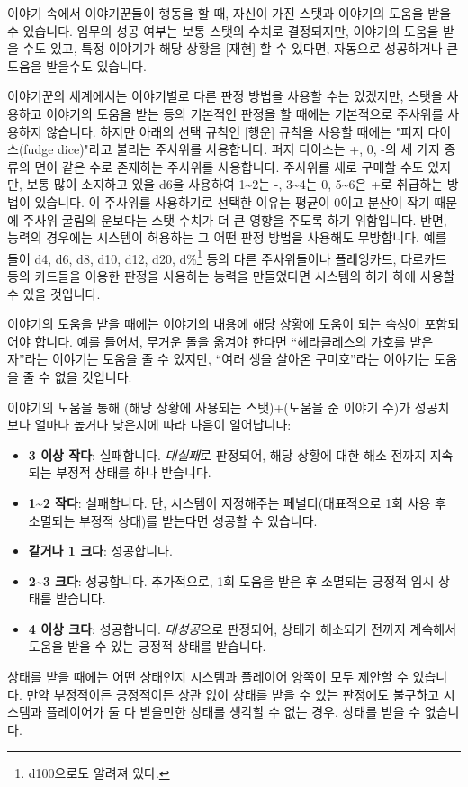 \documentclass[12pt]{report}
\begin{document}
	이야기 속에서 이야기꾼들이 행동을 할 때, 자신이 가진 스탯과 이야기의 도움을 받을 수 있습니다. 임무의 성공 여부는 보통 스탯의 수치로 결정되지만, 이야기의 도움을 받을 수도 있고, 특정 이야기가 해당 상황을 [재현] 할 수 있다면, 자동으로 성공하거나 큰 도움을 받을수도 있습니다.
	
	\bigskip
	
	이야기꾼의 세계에서는 이야기별로 다른 판정 방법을 사용할 수는 있겠지만, 스탯을 사용하고 이야기의 도움을 받는 등의 기본적인 판정을 할 때에는 기본적으로 주사위를 사용하지 않습니다. 하지만 아래의 선택 규칙인 [행운] 규칙을 사용할 때에는 "퍼지 다이스(fudge dice)"라고 불리는 주사위를 사용합니다. 퍼지 다이스는 +, 0, -의 세 가지 종류의 면이 같은 수로 존재하는 주사위를 사용합니다. 주사위를 새로 구매할 수도 있지만, 보통 많이 소지하고 있을 d6을 사용하여 1\textasciitilde2는 -, 3\textasciitilde4는 0, 5\textasciitilde6은 +로 취급하는 방법이 있습니다. 이 주사위를 사용하기로 선택한 이유는 평균이 0이고 분산이 작기 때문에 주사위 굴림의 운보다는 스탯 수치가 더 큰 영향을 주도록 하기 위함입니다. 반면, 능력의 경우에는 시스템이 허용하는 그 어떤 판정 방법을 사용해도 무방합니다. 예를 들어 d4, d6, d8, d10, d12, d20, d\%\footnote{d100으로도 알려져 있다.} 등의 다른 주사위들이나 플레잉카드, 타로카드 등의 카드들을 이용한 판정을 사용하는 능력을 만들었다면 시스템의 허가 하에 사용할 수 있을 것입니다.
	
	\bigskip
	
	이야기의 도움을 받을 때에는 이야기의 내용에 해당 상황에 도움이 되는 속성이 포함되어야 합니다. 예를 들어서, 무거운 돌을 옮겨야 한다면 “헤라클레스의 가호를 받은 자”라는 이야기는 도움을 줄 수 있지만, “여러 생을 살아온 구미호”라는 이야기는 도움을 줄 수 없을 것입니다.
	
	이야기의 도움을 통해 (해당 상황에 사용되는 스탯)+(도움을 준 이야기 수)가 성공치보다 얼마나 높거나 낮은지에 따라 다음이 일어납니다:
	\begin{itemize}
		\item \textbf{3 이상 작다}: 실패합니다. \emph{대실패}로 판정되어, 해당 상황에 대한 해소 전까지 지속되는 부정적 상태를 하나 받습니다.
		\item \textbf{1\textasciitilde2 작다}: 실패합니다. 단, 시스템이 지정해주는 페널티(대표적으로 1회 사용 후 소멸되는 부정적 상태)를 받는다면 성공할 수 있습니다.
		\item \textbf{같거나 1 크다}: 성공합니다.
		\item \textbf{2\textasciitilde3 크다}: 성공합니다. 추가적으로, 1회 도움을 받은 후 소멸되는 긍정적 임시 상태를 받습니다.
		\item \textbf{4 이상 크다}: 성공합니다. \emph{대성공}으로 판정되어, 상태가 해소되기 전까지 계속해서 도움을 받을 수 있는 긍정적 상태를 받습니다.
	\end{itemize}
	상태를 받을 때에는 어떤 상태인지 시스템과 플레이어 양쪽이 모두 제안할 수 있습니다. 만약 부정적이든 긍정적이든 상관 없이 상태를 받을 수 있는 판정에도 불구하고 시스템과 플레이어가 둘 다 받을만한 상태를 생각할 수 없는 경우, 상태를 받을 수 없습니다.
	
\end{document}
